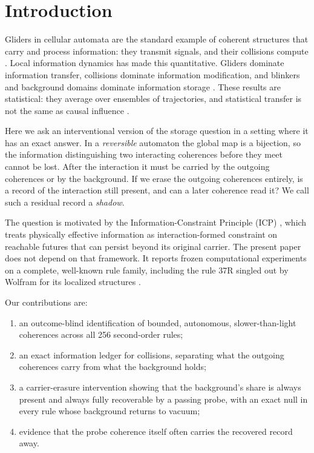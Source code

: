 \section{Introduction}
Gliders in cellular automata are the standard example of coherent structures that carry and
process information: they transmit signals, and their collisions compute
\cite{park1986,boccara1991,hanson1997,adamatzky2012}. Local information dynamics has made this
quantitative. Gliders dominate information transfer, collisions dominate information modification,
and blinkers and background domains dominate information storage
\cite{lizier2008,lizier2010mod,lizier2012}. These results are statistical: they average over
ensembles of trajectories, and statistical transfer is not the same as causal influence
\cite{lizier2010caus,james2016}.

Here we ask an interventional version of the storage question in a setting where it has an exact
answer. In a \emph{reversible} automaton the global map is a bijection, so the information
distinguishing two interacting coherences before they meet cannot be lost. After the interaction
it must be carried by the outgoing coherences or by the background. If we erase the outgoing
coherences entirely, is a record of the interaction still present, and can a later coherence read
it? We call such a residual record a \emph{shadow}.

The question is motivated by the Information-Constraint Principle (ICP) \cite{clark2026icp}, which
treats physically effective information as interaction-formed constraint on reachable futures that
can persist beyond its original carrier. The present paper does not depend on that framework. It
reports frozen computational experiments on a complete, well-known rule family, including the rule
37R singled out by Wolfram for its localized structures \cite{wolfram2002}.

Our contributions are:
\begin{enumerate}
\item an outcome-blind identification of bounded, autonomous, slower-than-light coherences across
all 256 second-order rules;
\item an exact information ledger for collisions, separating what the outgoing coherences carry
from what the background holds;
\item a carrier-erasure intervention showing that the background's share is always present and
always fully recoverable by a passing probe, with an exact null in every rule whose background
returns to vacuum;
\item evidence that the probe coherence itself often carries the recovered record away.
\end{enumerate}
